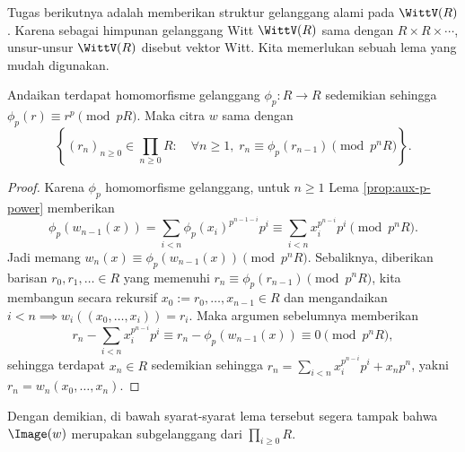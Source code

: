 Tugas berikutnya adalah memberikan struktur gelanggang alami pada $\WittV(R)$. Karena sebagai himpunan gelanggang Witt $\WittV(R)$ sama dengan $R \times R \times \cdots$, unsur-unsur $\WittV(R)$ disebut vektor Witt. Kita memerlukan sebuah lema yang mudah digunakan.
\begin{lemma}[B.\ Dwork]\label{prop:Dwork-Witt}
	Andaikan terdapat homomorfisme gelanggang $\phi_p: R \to R$ sedemikian sehingga $\phi_p(r) \equiv r^p \pmod {pR}$. Maka citra $w$ sama dengan
	\[ \left\{ (r_n)_{n \geq 0} \in \prod_{n \geq 0} R : \quad \forall n \geq 1, \; r_n \equiv \phi_p(r_{n-1}) \pmod {p^n R}  \right\}. \]
\end{lemma}
\begin{proof}
	Karena $\phi_p$ homomorfisme gelanggang, untuk $n \geq 1$ Lema \ref{prop:aux-p-power} memberikan
	\[ \phi_p(w_{n-1}(x)) = \sum_{i < n} \phi_p(x_i)^{p^{n-1-i}} p^i \equiv \sum_{i < n} x_i^{p^{n-i}} p^i \pmod {p^n R}. \]
	Jadi memang $w_n(x) \equiv \phi_p(w_{n-1}(x)) \pmod {p^n R}$. Sebaliknya, diberikan barisan $r_0, r_1, \ldots \in R$ yang memenuhi $r_n \equiv \phi_p(r_{n-1}) \pmod {p^n R}$, kita membangun secara rekursif $x_0 := r_0, \ldots, x_{n-1} \in R$ dan mengandaikan $i < n \implies w_i((x_0, \ldots, x_i)) = r_i$. Maka argumen sebelumnya memberikan
	\[ r_n - \sum_{i < n} x_i^{p^{n-i}} p^i \equiv r_n - \phi_p(w_{n-1}(x)) \equiv 0 \pmod {p^n R}, \]
	sehingga terdapat $x_n \in R$ sedemikian sehingga $r_n = \sum_{i<n} x_i^{p^{n-i}} p^i + x_n p^n$, yakni $r_n = w_n(x_0, \ldots, x_n)$.
\end{proof}
Dengan demikian, di bawah syarat-syarat lema tersebut segera tampak bahwa $\Image(w)$ merupakan subgelanggang dari $\prod_{i \geq 0} R$.

